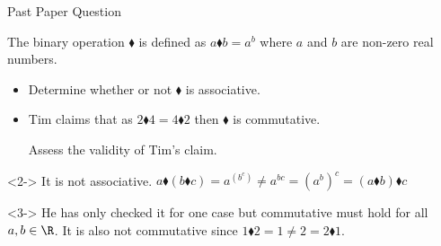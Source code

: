 \documentclass[8pt]{beamer}
\begin{document}
\begin{frame}{Past Paper Question}
	\begin{problem}
		The binary operation $\blacklozenge$ is defined as  $a\blacklozenge b= a^{b}$ where $a$ and  $ b$ are non-zero real numbers.
		 \begin{itemize}
			\item Determine whether or not $\blacklozenge$ is associative.
\item Tim claims that as $2\blacklozenge 4= 4 \blacklozenge 2 $ then $\blacklozenge$ is commutative.

	Assess the validity of Tim's claim.
		\end{itemize}
	\end{problem}

	\begin{solution}<2->
		It is not associative. $a\blacklozenge (b\blacklozenge c) = a^{(b^{c})} \neq a^{bc} = (a^{b})^{c}=(a\blacklozenge b)\blacklozenge c$
	\end{solution}

	\begin{solution}<3->
		He has only checked it for one case but commutative must hold for all $a,b\in \R$. It is also not commutative since $1\blacklozenge 2 = 1 \neq 2 = 2 \blacklozenge 1.$
	\end{solution}
\end{frame}
\end{document}
